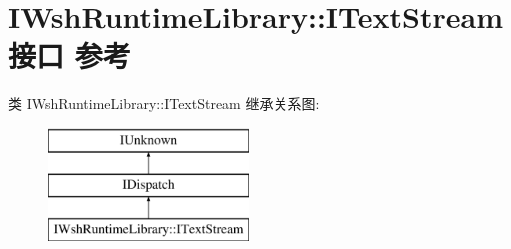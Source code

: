 \hypertarget{interface_i_wsh_runtime_library_1_1_i_text_stream}{}\section{I\+Wsh\+Runtime\+Library\+:\+:I\+Text\+Stream接口 参考}
\label{interface_i_wsh_runtime_library_1_1_i_text_stream}
类 I\+Wsh\+Runtime\+Library\+:\+:I\+Text\+Stream 继承关系图\+:\begin{figure}[H]
\begin{center}
\leavevmode
\includegraphics[height=3.000000cm]{interface_i_wsh_runtime_library_1_1_i_text_stream}
\end{center}
\end{figure}
